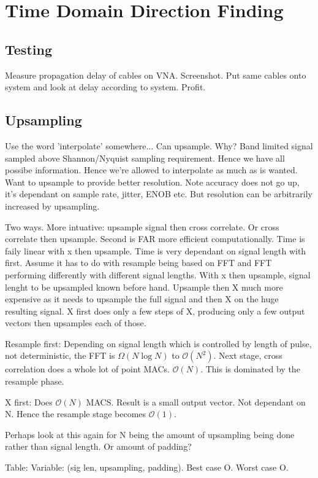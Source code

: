 \section{Time Domain Direction Finding}

\subsection{Testing}
Measure propagation delay of cables on VNA. Screenshot.
Put same cables onto system and look at delay according to system. 
Profit.

\subsection{Upsampling}
Use the word 'interpolate' somewhere...
Can upsample. Why? Band limited signal sampled above Shannon/Nyquist sampling requirement. Hence we have all possibe information. Hence we're allowed to interpolate as much as is wanted. 
Want to upsample to provide better resolution. Note accuracy does not go up, it's dependant on sample rate, jitter, ENOB etc. But resolution can be arbitrarily increased by upsampling.

Two ways. More intuative: upsample signal then cross correlate. 
Or cross correlate then upsample. Second is FAR more efficient computationally. 
Time is faily linear with x then upsample. Time is very dependant on signal length with first. Assume it has to do with resample being based on FFT and FFT performing differently with different signal lengths. With x then upsample, signal lenght to be upsampled known before hand.
Upsample then X much more expensive as it needs to upsample the full signal and then X on the huge resulting signal.
X first does only a few steps of X, producing only a few output vectors then upsamples each of those.

Resample first:
Depending on signal length which is controlled by length of pulse, not deterministic, the FFT is \(\Omega(N\log{N})\) to \(\mathcal{O}(N^2)\). Next stage, cross correlation does a whole lot of point MACs. \(\mathcal{O}(N)\). This is dominated by the resample phase. 

X first: Does \(\mathcal{O}(N)\) MACS. Result is a small output vector. Not dependant on N. Hence the resample stage becomes \(\mathcal{O}(1)\). 

Perhaps look at this again for N being the amount of upsampling being done rather than signal length. Or amount of padding?

Table: Variable: (sig len, upsampling, padding). Best case O. Worst case O. 

